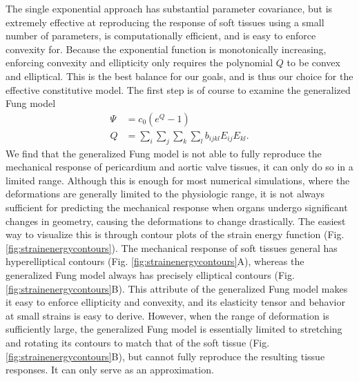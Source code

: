    The single exponential approach has substantial parameter covariance, but is extremely effective at reproducing the response of soft tissues using a small number of parameters, is computationally efficient, and is easy to enforce convexity for. Because the exponential function is monotonically increasing, enforcing convexity and ellipticity only requires the polynomial $Q$ to be convex and elliptical. This is the best balance for our goals, and is thus our choice for the effective constitutive model. The first step is of course to examine the generalized Fung model \cite{fung_pseudoelasticity_1979}
\begin{equation}
\begin{aligned}\label{eqn:fungmodel}
\Psi 	&= c_0 \left(e^{Q} - 1\right) \\
Q		&= \sum_i\sum_j\sum_k\sum_l b_{ijkl}E_{ij} E_{kl}.
\end{aligned}
\end{equation}
    We find that the generalized Fung model is not able to fully reproduce the mechanical response of pericardium and aortic valve tissues, it can only do so in a limited range. Although this is enough for most numerical simulations, where the deformations are generally limited to the physiologic range, it is not always sufficient for predicting the mechanical response when organs undergo significant changes in geometry, causing the deformations to change drastically. The easiest way to visualize this is through contour plots of the strain energy function (Fig. \ref{fig:strainenergycontours}). The mechanical response of soft tissues general has hyperelliptical contours (Fig. \ref{fig:strainenergycontours}A), whereas the generalized Fung model always has precisely elliptical contours (Fig. \ref{fig:strainenergycontours}B). This attribute of the generalized Fung model makes it easy to enforce ellipticity and convexity, and its elasticity tensor and behavior at small strains is easy to derive. However, when the range of deformation is sufficiently large, the generalized Fung model is essentially limited to stretching and rotating its contours to match that of the soft tissue (Fig. \ref{fig:strainenergycontours}B), but cannot fully reproduce the resulting tissue responses. It can only serve as an approximation.  


